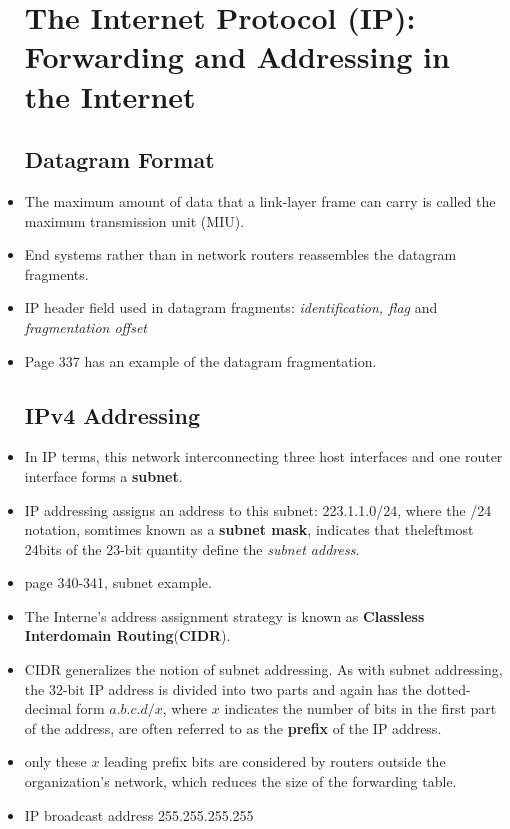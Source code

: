 \documentclass{article}
\begin{document}
\begin{itemize}
\section{The Internet Protocol (IP): Forwarding and Addressing in the
  Internet}
\subsection{Datagram Format}
\item The maximum amount of data that a link-layer frame can carry is
  called the maximum transmission unit (MIU).
\item End systems rather than in network routers reassembles the
  datagram fragments.
\item IP header field used in datagram fragments:
  \emph{identification, flag} and \emph{fragmentation offset}
\item Page 337 has an example of the datagram fragmentation.
\subsection{IPv4 Addressing}
\item In IP terms, this network interconnecting three host interfaces
  and one router interface forms a \textbf{subnet}.
\item IP addressing assigns an address to this subnet: 223.1.1.0/24,
  where the /24 notation, somtimes known as a \textbf{subnet mask},
  indicates that theleftmost 24bits of the 23-bit quantity define the
  \emph{subnet address}.
\item page 340-341, subnet example.
\item The Interne's address assignment strategy is known as
  \textbf{Classless Interdomain Routing}(\textbf{CIDR}).
\item CIDR generalizes the notion of subnet addressing. As with subnet
  addressing, the 32-bit IP address is divided into two parts and
  again has the dotted-decimal form $a.b.c.d/x$, where $x$ indicates
  the number of bits in the first part of the address, are often
  referred to as the \textbf{prefix} of the IP address.
\item only these $x$ leading prefix bits are considered by routers
  outside the organization's network, which reduces the size of the
  forwarding table.
\item IP broadcast address 255.255.255.255

\end{itemize}
\end{document}
